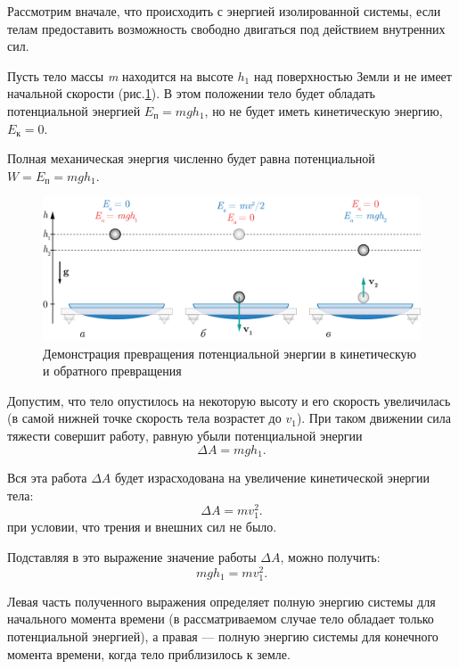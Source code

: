 \documentclass[14pt,a4paper,oneside]{extarticle}	%
\begin{document}
Рассмотрим вначале, что происходить с энергией изолированной системы, если телам предоставить возможность свободно двигаться под действием внутренних сил. 

Пусть тело массы \textit{m} находится на высоте $ h_1 $ над поверхностью 
Земли и не имеет начальной скорости (рис.\ref{transform-3}). 
В этом положении тело будет обладать потенциальной энергией $ E_\text{п}=mgh_1 $, но не будет иметь кинетическую энергию, $ E_\text{к}=0 $. 

Полная механическая энергия численно будет равна потенциальной $W = E_\text{п} =mgh_1$.

\begin{figure}[H] 
	\centering 	
	\includegraphics[width=0.9\linewidth]{transform-3.png}
	\caption{Демонстрация превращения потенциальной энергии в кинетическую и обратного превращения}
	\label{transform-3}
\end{figure}

Допустим, что тело опустилось на некоторую высоту и его скорость увеличилась (в самой нижней точке скорость тела возрастет до $ v_1 $).
При таком движении сила тяжести совершит работу, равную убыли потенциальной энергии
\begin{equation}
\Delta A=mgh_1.
\end{equation}

Вся эта работа $ \Delta A  $ будет израсходована на увеличение кинетической энергии тела: 
\begin{equation}
\Delta A=mv_1^2.
\end{equation}
при условии, что трения и внешних сил не было. 

Подставляя в это выражение значение работы $ \Delta A $, можно получить: 
\begin{equation}
mgh_1=mv_1^2.
\end{equation}

Левая часть полученного выражения определяет полную энергию системы для начального момента времени (в рассматриваемом случае тело обладает только потенциальной энергией), 
а правая — полную энергию системы для конечного момента времени, когда тело приблизилось к земле.
\end{document}
